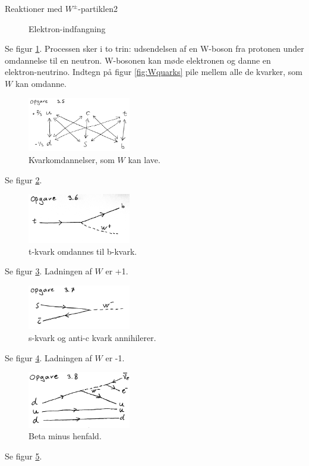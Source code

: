 \begin{opgave}{Reaktioner med $W^\pm$-partiklen}{2}
\begin{figure}[h]
  \caption{Elektron-indfangning}
  \label{fig:opg34}
\end{figure}
Se figur \ref{fig:opg34}.
\bigskip
Processen sker i to trin: udsendelsen af en W-boson fra protonen under omdannelse til en neutron. W-bosonen kan møde elektronen og danne en elektron-neutrino.
\opg Indtegn på figur \ref{fig:Wquarks} pile mellem alle de kvarker, som $W$ kan omdanne. 
\begin{figure}[h]
  \centering
  \includegraphics[width=0.4\textwidth]{KernePartikel/opg35.png}
  \caption{Kvarkomdannelser, som $W$ kan lave.}
  \label{fig:opg35}
\end{figure}
Se figur \ref{fig:opg35}.
\opg 
\begin{figure}[h]
  \centering
  \includegraphics[width=0.4\textwidth]{KernePartikel/opg36.png}
  \caption{t-kvark omdannes til b-kvark.}
  \label{fig:opg36}
\end{figure}
Se figur \ref{fig:opg36}.
\bigskip
Ladningen af $W$ er +1.
\opg 
\begin{figure}[h]
  \centering
  \includegraphics[width=0.4\textwidth]{KernePartikel/opg37.png}
  \caption{s-kvark og anti-c kvark annihilerer.}
  \label{fig:opg37}
\end{figure}
Se figur \ref{fig:opg37}.
\bigskip
Ladningen af $W$ er -1.
\opg 
\begin{figure}[h]
  \centering
  \includegraphics[width=0.4\textwidth]{KernePartikel/opg38.png}
  \caption{Beta minus henfald.}
  \label{fig:opg38}
\end{figure}
Se figur \ref{fig:opg38}.
\end{opgave}


